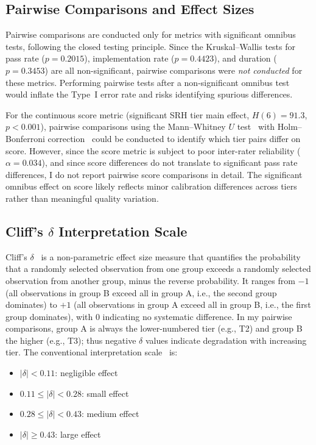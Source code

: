 \documentclass[11pt]{article}
\begin{document}
\subsection{Pairwise Comparisons and Effect Sizes}

Pairwise comparisons are conducted only for metrics with significant omnibus
tests, following the closed testing principle. Since the Kruskal--Wallis tests
for pass rate ($p=0.2015$), implementation rate ($p=0.4423$), and duration
($p=0.3453$) are all non-significant, pairwise comparisons were \emph{not
conducted} for these metrics. Performing pairwise tests after a non-significant
omnibus test would inflate the Type~I error rate and risks identifying spurious
differences.

For the continuous score metric (significant SRH tier main effect, $H(6)=91.3$,
$p<0.001$), pairwise comparisons using the Mann--Whitney $U$
test~\cite{mann1947test} with Holm--Bonferroni correction~\cite{holm1979simple}
could be conducted to identify which tier pairs differ on score. However, since
the score metric is subject to poor inter-rater reliability ($\alpha = 0.034$),
and since score differences do not translate to significant pass rate
differences, I do not report pairwise score comparisons in detail. The
significant omnibus effect on score likely reflects minor calibration
differences across tiers rather than meaningful quality variation.

\subsection{Cliff's $\delta$ Interpretation Scale}

Cliff's $\delta$~\cite{cliff1993dominance, vargha2000critique} is a non-parametric effect size
measure that quantifies the probability that a randomly selected observation
from one group exceeds a randomly selected observation from another group,
minus the reverse probability. It ranges from $-1$ (all observations in
group B exceed all in group A, i.e., the second group dominates) to $+1$
(all observations in group A exceed all in group B, i.e., the first group
dominates), with 0 indicating no systematic difference. In my pairwise
comparisons, group A is always the lower-numbered tier (e.g., T2) and group
B the higher (e.g., T3); thus negative $\delta$ values indicate degradation
with increasing tier. The conventional interpretation
scale~\cite{romano2006appropriate} is:

\begin{itemize}
  \item $|\delta| < 0.11$: negligible effect
  \item $0.11 \leq |\delta| < 0.28$: small effect
  \item $0.28 \leq |\delta| < 0.43$: medium effect
  \item $|\delta| \geq 0.43$: large effect
\end{itemize}
\end{document}
